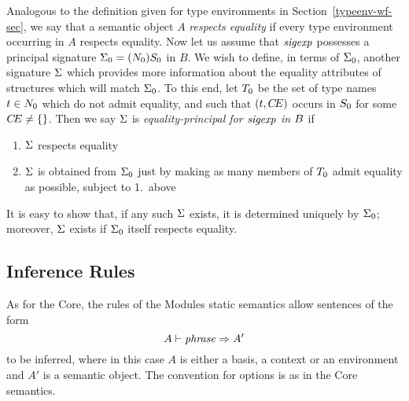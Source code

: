 {Analogous to the definition given for type environments in
Section~\ref{typeenv-wf-sec}, we say that a semantic object $A$
{\sl respects equality} if every type environment occurring in 
$A$ respects equality. 
%
%
%
\oldpagebreak
Now let us assume that $\sigexp$ possesses a principal signature
$\sig_0=\longsig{0}$ in $B$. We wish to
define, in terms of $\sig_0$, another signature $\sig$ which provides more
information about the equality attributes of structures which will
match $\sig_0$. To this end, let $\T_0$ be the set of type names $\t\in\N_0$
which do not admit equality, and such that $(\t,\CE)$ occurs in $\S_0$
for some $\CE\neq\emptymap$.  Then we say $\sig$ is 
{\sl equality-principal for $\sigexp$ in $\B$} if
\begin{enumerate}
\item
$\sig$ respects equality
\item
$\sig$ is obtained from $\sig_0$ just by making as many
members of $\T_0$ admit equality as possible, subject to 1.~above
\end{enumerate}
It is easy to show that, if any such $\sig$ exists, it is determined
uniquely by $\sig_0$; moreover, $\sig$ exists if $\sig_0$ itself
respects equality.
\bigskip}


%

%
\subsection{Inference Rules}
\label{statmod-rules-sec}
As for the Core, the rules of the Modules static semantics allow
sentences of the form
\[ A\ts\phrase\ra A'\]
to be inferred, where in this case $A$ is either a basis, a context or
an environment and $A'$ is a semantic object.  The convention for options
is as in the Core semantics. 

